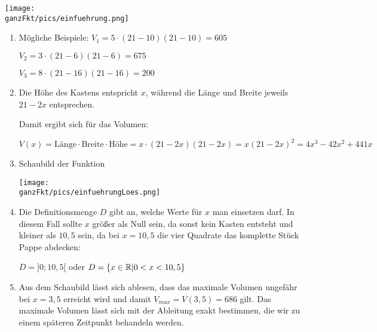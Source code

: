 \texttt{[image: \\ganzFkt/pics/einfuehrung.png]}
\newpage
\begin{enumerate}[label=\alph*)]
	\item Mögliche Beispiele: \(V_1=5\cdot \left(21-10\right)\left(21-10\right)=605\)

	\hphantom{Mögliche Beispiele: }\(V_2=3\cdot \left(21-6\right)\left(21-6\right)=675\)

	\hphantom{Mögliche Beispiele: }\(V_3=8\cdot \left(21-16\right)\left(21-16\right)=200\)
	\item Die Höhe des Kastens entspricht \(x\), während die Länge und Breite jeweils \(21-2x\) entsprechen.

	Damit ergibt sich für das Volumen:

	\(V(x)=\text{Länge}\cdot \text{Breite}\cdot \text{Höhe}=x\cdot \left(21-2x\right)\left(21-2x\right)=x\left(21-2x\right)^2=4x^3-42x^2+441x\)
	\item
	Schaubild der Funktion\\
	\begin{minipage}{\linewidth}
		\texttt{[image: \\ganzFkt/pics/einfuehrungLoes.png]}
	\end{minipage}

	\item Die Definitionsmenge \(D\) gibt an, welche Werte für \(x\) man einsetzen darf. In diesem Fall sollte \(x\) größer als Null sein, da sonst kein Kasten entsteht und kleiner als \(10,5\) sein, da bei \(x=10,5\) die vier Quadrate das komplette Stück Pappe abdecken:

	\(D=]0;10,5[\) oder \(D=\{x\in\mathbb{R} \vert 0< x < 10,5\}\)
	\item Aus dem Schaubild lässt sich ablesen, dass das maximale Volumen ungefähr bei \(x=3,5\) erreicht wird und damit  \(V_{max}=V(3,5)=686\) gilt. Das maximale Volumen lässt sich mit der Ableitung exakt bestimmen, die wir zu einem späteren Zeitpunkt behandeln werden.
\end{enumerate}